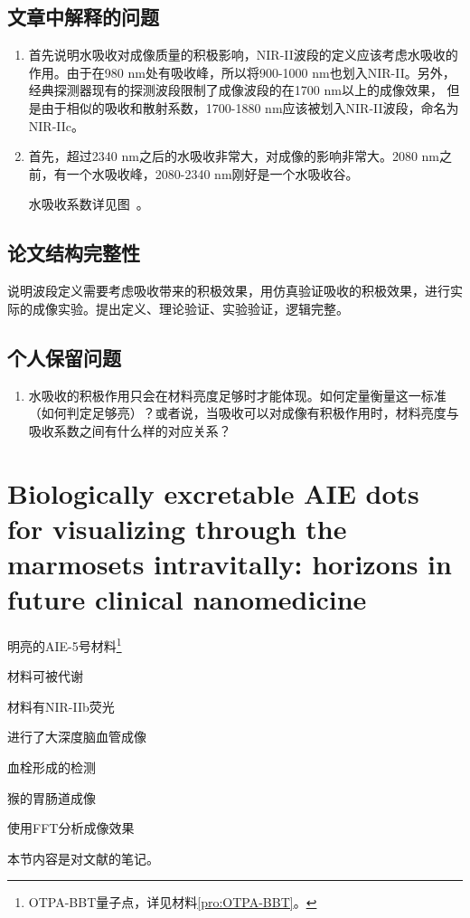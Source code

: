 \documentclass[cn,11pt,chinese]{elegantbook}
\begin{document}
\subsection{文章中解释的问题}
 \begin{enumerate}[itemsep=1.5ex]
   \item {}
   首先说明水吸收对成像质量的积极影响，NIR-II波段的定义应该考虑水吸收的作用。由于在980 nm处有吸收峰，所以将900-1000 nm也划入NIR-II。另外，
   经典探测器现有的探测波段限制了成像波段的在1700 nm以上的成像效果，
   但是由于相似的吸收和散射系数，1700-1880 nm应该被划入NIR-II波段，命名为NIR-IIc。
   \item {}
  首先，超过2340 nm之后的水吸收非常大，对成像的影响非常大。2080 nm之前，有一个水吸收峰，2080-2340 nm刚好是一个水吸收谷。
  \begin{note}
    水吸收系数详见图~。
  \end{note}
 \end{enumerate} 

\subsection{论文结构完整性}
说明波段定义需要考虑吸收带来的积极效果，用仿真验证吸收的积极效果，进行实际的成像实验。提出定义、理论验证、实验验证，逻辑完整。

\subsection{个人保留问题}

\begin{enumerate}
  \item 水吸收的积极作用只会在材料亮度足够时才能体现。如何定量衡量这一标准（如何判定足够亮）？或者说，当吸收可以对成像有积极作用时，材料亮度与吸收系数之间有什么样的对应关系？
\end{enumerate}


\section{Biologically excretable AIE dots for visualizing through the marmosets intravitally: horizons in future clinical nanomedicine}

\begin{introduction}[创新点概要]
  \item 明亮的AIE-5号材料\footnote{OTPA-BBT量子点，详见材料\vref{pro:OTPA-BBT}。}
  \item 材料可被代谢
  \item 材料有NIR-IIb荧光
  \item 进行了大深度脑血管成像
  \item 血栓形成的检测
  \item 猴的胃肠道成像
  \item 使用FFT分析成像效果
\end{introduction}
本节内容是对文献\cite{Feng2021}的笔记。
\end{document}
